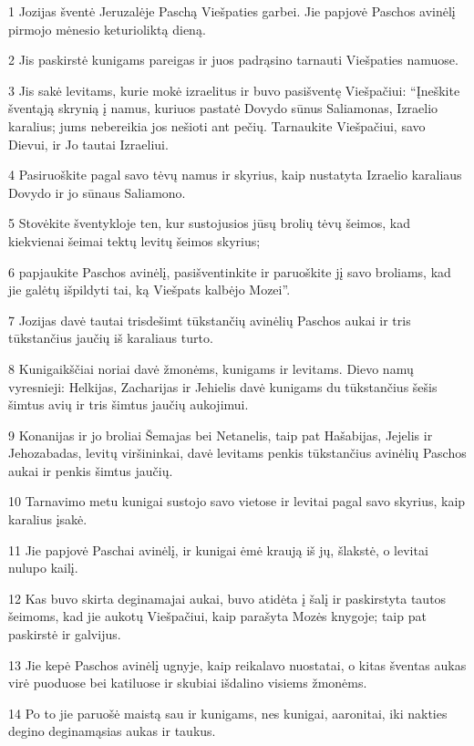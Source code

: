 \par 1 Jozijas šventė Jeruzalėje Paschą Viešpaties garbei. Jie papjovė Paschos avinėlį pirmojo mėnesio keturioliktą dieną. 
\par 2 Jis paskirstė kunigams pareigas ir juos padrąsino tarnauti Viešpaties namuose. 
\par 3 Jis sakė levitams, kurie mokė izraelitus ir buvo pasišventę Viešpačiui: “Įneškite šventąją skrynią į namus, kuriuos pastatė Dovydo sūnus Saliamonas, Izraelio karalius; jums nebereikia jos nešioti ant pečių. Tarnaukite Viešpačiui, savo Dievui, ir Jo tautai Izraeliui. 
\par 4 Pasiruoškite pagal savo tėvų namus ir skyrius, kaip nustatyta Izraelio karaliaus Dovydo ir jo sūnaus Saliamono. 
\par 5 Stovėkite šventykloje ten, kur sustojusios jūsų brolių tėvų šeimos, kad kiekvienai šeimai tektų levitų šeimos skyrius; 
\par 6 papjaukite Paschos avinėlį, pasišventinkite ir paruoškite jį savo broliams, kad jie galėtų išpildyti tai, ką Viešpats kalbėjo Mozei”. 
\par 7 Jozijas davė tautai trisdešimt tūkstančių avinėlių Paschos aukai ir tris tūkstančius jaučių iš karaliaus turto. 
\par 8 Kunigaikščiai noriai davė žmonėms, kunigams ir levitams. Dievo namų vyresnieji: Helkijas, Zacharijas ir Jehielis davė kunigams du tūkstančius šešis šimtus avių ir tris šimtus jaučių aukojimui. 
\par 9 Konanijas ir jo broliai Šemajas bei Netanelis, taip pat Hašabijas, Jejelis ir Jehozabadas, levitų viršininkai, davė levitams penkis tūkstančius avinėlių Paschos aukai ir penkis šimtus jaučių. 
\par 10 Tarnavimo metu kunigai sustojo savo vietose ir levitai pagal savo skyrius, kaip karalius įsakė. 
\par 11 Jie papjovė Paschai avinėlį, ir kunigai ėmė kraują iš jų, šlakstė, o levitai nulupo kailį. 
\par 12 Kas buvo skirta deginamajai aukai, buvo atidėta į šalį ir paskirstyta tautos šeimoms, kad jie aukotų Viešpačiui, kaip parašyta Mozės knygoje; taip pat paskirstė ir galvijus. 
\par 13 Jie kepė Paschos avinėlį ugnyje, kaip reikalavo nuostatai, o kitas šventas aukas virė puoduose bei katiluose ir skubiai išdalino visiems žmonėms. 
\par 14 Po to jie paruošė maistą sau ir kunigams, nes kunigai, aaronitai, iki nakties degino deginamąsias aukas ir taukus. 
